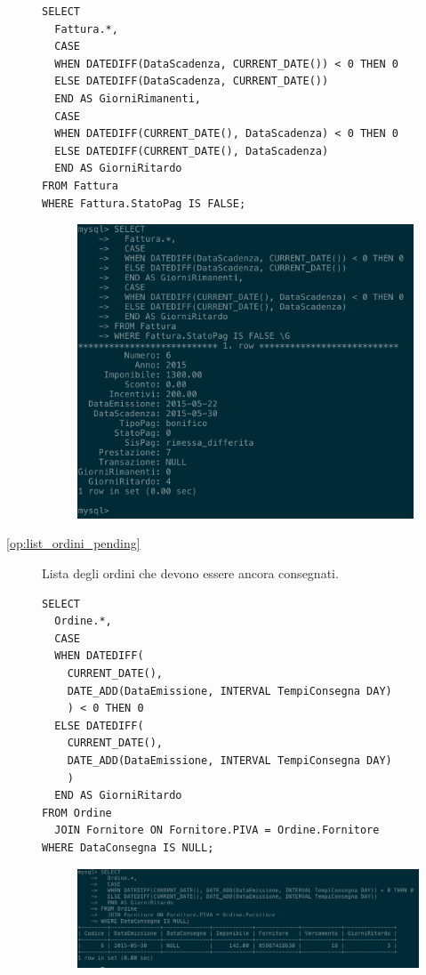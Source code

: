 \begin{description}
              \begin{lstlisting}
SELECT
  Fattura.*,
  CASE
  WHEN DATEDIFF(DataScadenza, CURRENT_DATE()) < 0 THEN 0
  ELSE DATEDIFF(DataScadenza, CURRENT_DATE())
  END AS GiorniRimanenti,
  CASE
  WHEN DATEDIFF(CURRENT_DATE(), DataScadenza) < 0 THEN 0
  ELSE DATEDIFF(CURRENT_DATE(), DataScadenza)
  END AS GiorniRitardo
FROM Fattura
WHERE Fattura.StatoPag IS FALSE;
              \end{lstlisting}

              \begin{figure}[H]
                \centering
                \includegraphics[width=10cm]{images/screenshots/list_fatture_pending.png}
              \end{figure}

            \item[\ref{op:list_ordini_pending}] Lista degli ordini che devono essere ancora consegnati.

              \begin{lstlisting}
SELECT
  Ordine.*,
  CASE
  WHEN DATEDIFF(
    CURRENT_DATE(), 
    DATE_ADD(DataEmissione, INTERVAL TempiConsegna DAY)
    ) < 0 THEN 0
  ELSE DATEDIFF(
    CURRENT_DATE(), 
    DATE_ADD(DataEmissione, INTERVAL TempiConsegna DAY)
    )
  END AS GiorniRitardo
FROM Ordine
  JOIN Fornitore ON Fornitore.PIVA = Ordine.Fornitore
WHERE DataConsegna IS NULL;
              \end{lstlisting}

              \begin{figure}[H]
                \centering
                \includegraphics[width=14cm]{images/screenshots/list_ordini_pending.png}
              \end{figure}


\end{description}
